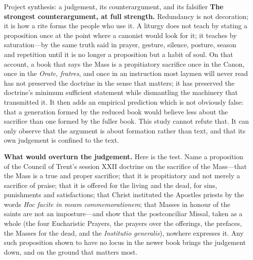 \begin{studybox}{Project synthesis: a judgement, its counterargument, and its falsifier}
\smallskip
\textbf{The strongest counterargument, at full strength.} Redundancy is not decoration; it is how a rite forms the people who use it. A liturgy does not teach by stating a proposition once at the point where a canonist would look for it; it teaches by saturation---by the same truth said in prayer, gesture, silence, posture, season and repetition until it is no longer a proposition but a habit of soul. On that account, a book that says the Mass is a propitiatory sacrifice once in the Canon, once in the \emph{Orate, fratres}, and once in an instruction most laymen will never read has not preserved the doctrine in the sense that matters; it has preserved the doctrine's minimum sufficient statement while dismantling the machinery that transmitted it. It then adds an empirical prediction which is not obviously false: that a generation formed by the reduced book would believe less about the sacrifice than one formed by the fuller book. This study cannot refute that. It can only observe that the argument is about formation rather than text, and that its own judgement is confined to the text.

\textbf{What would overturn the judgement.} Here is the test. Name a proposition of the Council of Trent's session XXII doctrine on the sacrifice of the Mass---that the Mass is a true and proper sacrifice; that it is propitiatory and not merely a sacrifice of praise; that it is offered for the living and the dead, for sins, punishments and satisfactions; that Christ instituted the Apostles priests by the words \emph{Hoc facite in meam commemorationem}; that Masses in honour of the saints are not an imposture---and show that the postconciliar Missal, taken as a whole (the four Eucharistic Prayers, the prayers over the offerings, the prefaces, the Masses for the dead, and the \emph{Institutio generalis}), nowhere expresses it. Any such proposition shown to have no locus in the newer book brings the judgement down, and on the ground that matters most.


\end{studybox}
